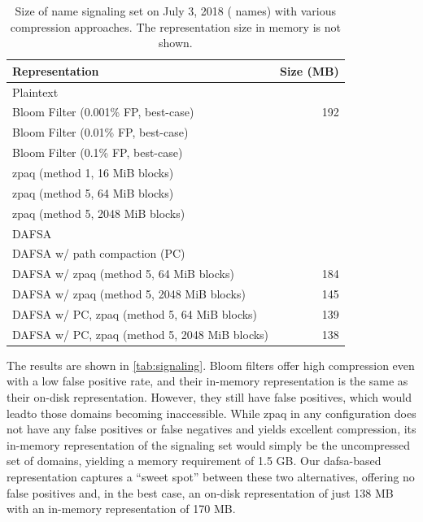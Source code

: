 

\begin{table}[t]
  \centering
  \caption{Size of \ac{name} signaling set on
    July 3, 2018 (\numnames{} names) with various compression approaches. The
    representation size in memory is not shown.}
  \begin{tabularx}{\linewidth}{|Xr|}
    \toprule
    \textbf{Representation} & \textbf{Size (MB)} \\
    \midrule
    Plaintext & \plaintextsize \\
    \midrule
    Bloom Filter (0.001\% FP, best-case) & 192 \\
    Bloom Filter (0.01\% FP, best-case) & \bloomlargesize \\
    Bloom Filter (0.1\% FP, best-case) & \bloommedsize \\
    \midrule
    zpaq (method 1, 16 MiB blocks) & \zpaqlargesize \\
    zpaq (method 5, 64 MiB blocks) & \zpaqmedsize \\
    zpaq (method 5, 2048 MiB blocks) & \zpaqsmallsize \\
    \midrule
    DAFSA & \fsalargesize \\
    DAFSA w/ path compaction (PC) & \fsamedsize \\
    DAFSA w/ zpaq (method 5, 64 MiB blocks) & 184 \\
    DAFSA w/ zpaq (method 5, 2048 MiB blocks) & 145 \\
    DAFSA w/ PC, zpaq (method 5, 64 MiB blocks) & 139 \\
    DAFSA w/ PC, zpaq (method 5, 2048 MiB blocks) & 138 \\
    \bottomrule
  \end{tabularx}
  \label{tab:signaling}
\end{table}

The results are shown in \autoref{tab:signaling}. Bloom filters offer high
compression even with a low false positive rate, and their in-memory
representation is the same as their on-disk representation. However, they still
have false positives, which would leadto those domains becoming inaccessible.
While zpaq in any configuration does not have any false positives or false
negatives and yields excellent compression, its in-memory representation of the
signaling set would simply be the uncompressed set of domains, yielding a memory
requirement of 1.5 GB. Our \ac{dafsa}-based representation captures a ``sweet
spot'' between these two alternatives, offering no false positives and, in the
best case, an on-disk representation of just 138 MB with an in-memory
representation of 170 MB.

